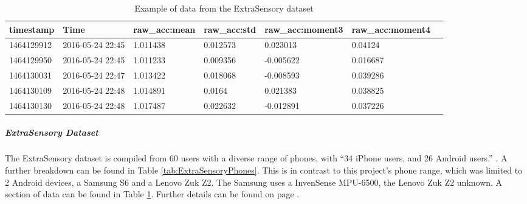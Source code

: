 \documentclass{UoNMCHA}
\newcommand{\inlineQuote}[1]{``#1''}
\newcommand{\fancyquote}[1]{\begin{quotation}\inlineQuote{#1}\end{quotation}}
\newcommand{\tref}[1] {Table \ref{#1}}
\numberwithin{equation}{section}
\begin{document}
    
\begin{table}
    \begin{center}
        \caption{Example of data from the ExtraSensory dataset}\label{tab:ExtraSensoryDataExample}
        \begin{tabular}{lllllll}
            \hline\hline timestamp  & Time & raw\_acc:mean & raw\_acc:std & raw\_acc:moment3 & raw\_acc:moment4 \\\hline 
        1464129912 & 2016-05-24 22:45 & 1.011438                       & 0.012573                      & 0.023013                          & 0.04124      \\
        1464129950 & 2016-05-24 22:45 & 1.011233                       & 0.009356                      & -0.005622                         & 0.016687     \\
        1464130031 & 2016-05-24 22:47 & 1.013422                       & 0.018068                      & -0.008593                         & 0.039286     \\
        1464130109 & 2016-05-24 22:48 & 1.014891                       & 0.0164                        & 0.021383                          & 0.038825     \\
        1464130130 & 2016-05-24 22:48 & 1.017487                       & 0.022632                      & -0.012891                         & 0.037226    \\\hline 
        \end{tabular}
    \end{center}
\end{table}


\subparagraph{ExtraSensory Dataset}
The ExtraSensory dataset is compiled from 60 users with a diverse range of phones, with \inlineQuote{34 iPhone users, and 26 Android users.} \cite{Vaizman2017}. A further breakdown can be found in \tref{tab:ExtraSensoryPhones}. This is in contrast to this project's phone range, which was limited to 2 Android devices, a Samsung S6 and a Lenovo Zuk Z2. The Samsung uses a InvenSense MPU-6500, the Lenovo Zuk Z2 unknown. A section of data can be found in \tref{tab:ExtraSensoryDataExample}. Further details can be found on page \pageref{para:ExtraSensorydataset}.

\end{document}
